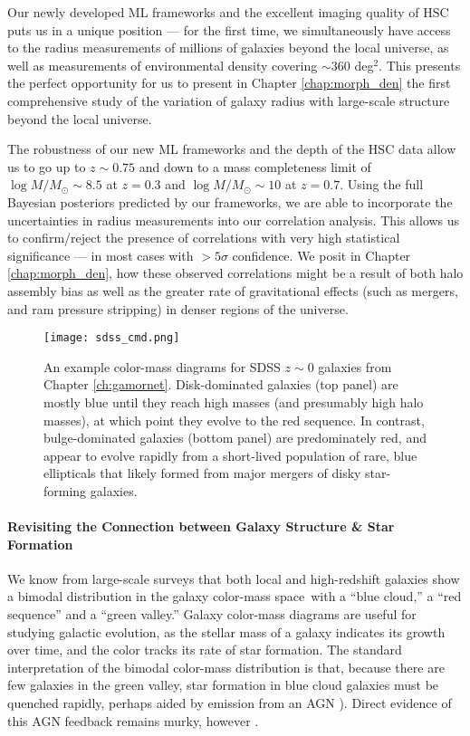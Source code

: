 Our newly developed ML frameworks and the excellent imaging quality of HSC puts us in a unique position --- for the first time, we simultaneously have access to the radius measurements of millions of galaxies beyond the local universe, as well as measurements of environmental density covering $\sim360$ deg$^2$. This presents the perfect opportunity for us to present in Chapter \ref{chap:morph_den} the first comprehensive study of the variation of galaxy radius with large-scale structure beyond the local universe. 

The robustness of our new ML frameworks and the depth of the HSC data allow us to go up to $z\sim0.75$ and down to a mass completeness limit of $\log M/M_{\odot} \sim 8.5$ at $z=0.3$ and $\log M/M_{\odot} \sim 10$ at $z=0.7$. Using the full Bayesian posteriors predicted by our frameworks, we are able to incorporate the uncertainties in radius measurements into our correlation analysis. This allows us to confirm/reject the presence of correlations with very high statistical significance --- in most cases with $>5\sigma$ confidence. We posit in Chapter \ref{chap:morph_den}, how these observed correlations might be a result of both halo assembly bias as well as the greater rate of gravitational effects (such as mergers, and ram pressure stripping) in denser regions of the universe. 

\begin{wrapfigure}{R}{0.4\textwidth}
\centering
\texttt{[image: sdss\_cmd.png]}
\vspace{-0.3in}
\caption{An example color-mass diagrams for SDSS $z\sim0$ galaxies from Chapter \ref{ch:gamornet}. Disk-dominated galaxies (top panel) are mostly blue until they reach high masses (and presumably high halo masses), at which point they evolve to the red sequence. In contrast, bulge-dominated galaxies (bottom panel) are predominately red, and appear to evolve rapidly from a short-lived population of rare, blue ellipticals that likely formed from major mergers of disky star-forming galaxies.}
\label{fig_intro:sdss_cmd}
\vspace{-0.2in}
\end{wrapfigure}

\paragraph{Revisiting the Connection between Galaxy Structure \& Star Formation} We know from large-scale surveys that both local and high-redshift galaxies show a bimodal distribution in the galaxy color-mass space\,\citep{strateva_01,baldry_04,baldry_06,brammer_09} with a ``blue cloud,'' a ``red sequence'' and a ``green valley.'' Galaxy color-mass diagrams are useful for studying galactic evolution, as the stellar mass of a galaxy indicates its growth over time, and the color tracks its rate of star formation. The standard interpretation of the bimodal color-mass distribution is that, because there are few galaxies in the green valley, star formation in blue cloud galaxies must be quenched rapidly, perhaps aided by emission from an AGN \citep{bell_04,faber_07}). Direct evidence of this AGN feedback remains murky, however \citep{harrison_17}.

